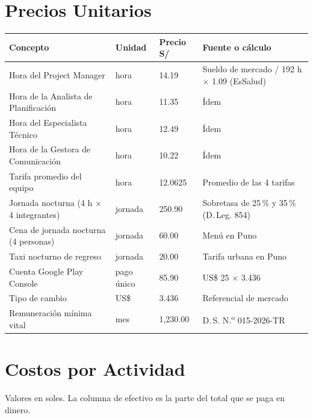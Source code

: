\documentclass[11pt,a4paper]{article}
\begin{document}
\section{Precios Unitarios}
{\small
{}
\noindent\begin{tabularx}{\textwidth}{@{}P{5.6cm} C{1.7cm} Q{1.6cm} L@{}}
\toprule
{}
\textbf{Concepto} & \textbf{Unidad} & \textbf{Precio S/} & \textbf{Fuente o cálculo} \\
\midrule
Hora del Project Manager & hora & 14.19 & Sueldo de mercado / 192 h $\times$ 1.09 (EsSalud) \\
Hora de la Analista de Planificación & hora & 11.35 & Ídem \\
Hora del Especialista Técnico & hora & 12.49 & Ídem \\
Hora de la Gestora de Comunicación & hora & 10.22 & Ídem \\
Tarifa promedio del equipo & hora & 12.0625 & Promedio de las 4 tarifas \\
Jornada nocturna (4 h $\times$ 4 integrantes) & jornada & 250.90 & Sobretasa de 25\,\% y 35\,\% (D.\,Leg. 854) \\
Cena de jornada nocturna (4 personas) & jornada & 60.00 & Menú en Puno \\
Taxi nocturno de regreso & jornada & 20.00 & Tarifa urbana en Puno \\
Cuenta Google Play Console & pago único & 85.90 & US\$ 25 $\times$ 3.436 \\
Tipo de cambio & US\$ & 3.436 & Referencial de mercado \\
Remuneración mínima vital & mes & 1,230.00 & D.\,S. N.\textsuperscript{o} 015-2026-TR \\
\bottomrule
\end{tabularx}
}

\section{Costos por Actividad}
Valores en soles. La columna de efectivo es la parte del total que se paga en dinero.
\end{document}
